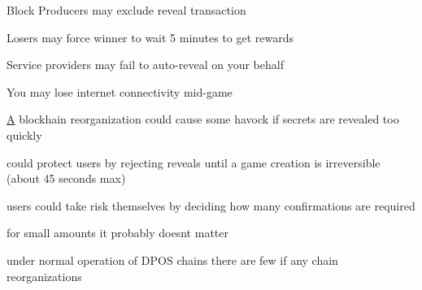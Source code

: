 \begin{DoxyEnumerate}
\item Block Producers may exclude reveal transaction
\item Losers may force winner to wait 5 minutes to get rewards
\item Service providers may fail to auto-\/reveal on your behalf
\item You may lose internet connectivity mid-\/game
\item \mbox{\hyperlink{struct_a}{A}} blockhain reorganization could cause some havock if secrets are revealed too quickly
\begin{DoxyItemize}
\item could protect users by rejecting reveals until a game creation is irreversible (about 45 seconds max)
\item users could take risk themselves by deciding how many confirmations are required
\item for small amounts it probably doesn\textquotesingle{}t matter
\item under normal operation of D\+P\+OS chains there are few if any chain reorganizations 
\end{DoxyItemize}
\end{DoxyEnumerate}